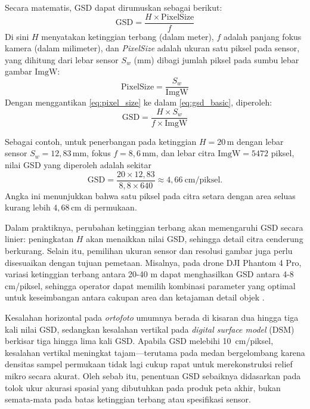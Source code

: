 Secara matematis, GSD dapat dirumuskan sebagai berikut:
\begin{equation}
  \label{eq:gsd_basic}
  \mathrm{GSD}
  = \frac{H \times \mathrm{PixelSize}}{f}
\end{equation}
Di sini $H$ menyatakan ketinggian terbang (dalam meter), $f$ adalah panjang fokus kamera (dalam milimeter), dan \emph{PixelSize} adalah ukuran satu piksel pada sensor, yang dihitung dari lebar sensor $S_w$ (mm) dibagi jumlah piksel pada sumbu lebar gambar $\mathrm{ImgW}$:
\begin{equation}
  \label{eq:pixel_size}
  \mathrm{PixelSize}
  = \frac{S_w}{\mathrm{ImgW}}
\end{equation}
Dengan menggantikan \eqref{eq:pixel_size} ke dalam \eqref{eq:gsd_basic}, diperoleh:
\begin{equation}
  \label{eq:gsd_full}
  \mathrm{GSD}
  = \frac{H \times S_w}{f \times \mathrm{ImgW}}
\end{equation}

Sebagai contoh, untuk penerbangan pada ketinggian $H = 20\,$m dengan lebar sensor $S_w = 12{,}83\,$mm, fokus $f = 8{,}6\,$mm, dan lebar citra $\mathrm{ImgW} = 5472$ piksel, nilai GSD yang diperoleh adalah sekitar
\[
  \mathrm{GSD}
  = \frac{20 \times 12{,}83}{8{,}8 \times 640}
  \approx 4{,}66\ \mathrm{cm/piksel}.
\]
Angka ini menunjukkan bahwa satu piksel pada citra setara dengan area seluas kurang lebih $4{,}68\,$cm di permukaan.

Dalam praktiknya, perubahan ketinggian terbang akan memengaruhi GSD secara linier: peningkatan $H$ akan menaikkan nilai GSD, sehingga detail citra cenderung berkurang. Selain itu, pemilihan ukuran sensor dan resolusi gambar juga perlu disesuaikan dengan tujuan pemetaan. Misalnya, pada drone DJI Phantom 4 Pro, variasi ketinggian terbang antara 20-40 m dapat menghasilkan GSD antara 4-8 cm/piksel, sehingga operator dapat memilih kombinasi parameter yang optimal untuk keseimbangan antara cakupan area dan ketajaman detail objek \cite{Tilon2023}.

Kesalahan horizontal pada \emph{ortofoto} umumnya berada di kisaran dua hingga tiga kali nilai GSD, sedangkan kesalahan vertikal pada \emph{digital surface model} (DSM) berkisar tiga hingga lima kali GSD. Apabila GSD melebihi 10~cm/piksel, kesalahan vertikal meningkat tajam—terutama pada medan bergelombang karena densitas sampel permukaan tidak lagi cukup rapat untuk merekonstruksi relief mikro secara akurat. Oleh sebab itu, penentuan GSD sebaiknya didasarkan pada tolok ukur akurasi spasial yang dibutuhkan pada produk peta akhir, bukan semata-mata pada batas ketinggian terbang atau spesifikasi sensor.



